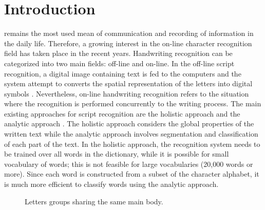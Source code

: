 \documentclass[journal,compsoc]{IEEEtran}
\begin{document}
\IEEEdisplaynotcompsoctitleabstractindextext

\section{Introduction}
\date
{} remains the most used mean of communication and recording of information in the daily life. Therefore, a growing interest in the on-line character recognition field has taken place in the recent years.
Handwriting recognition can be categorized into two main fields: off-line and on-line. In the off-line script recognition, a digital image containing text is fed to the computers and the system attempt to converts the spatial representation of the letters into digital symbols \cite{al2011online}. Nevertheless, on-line handwriting recognition refers to the situation where the recognition is performed concurrently to the writing process. The main existing approaches for script recognition are the holistic approach \cite{biadsy2011segmentation} and the analytic approach \cite{abdulla2008off, sari2002off, Dinges2011, elanwar2012unconstrained}. The holistic approach considers the global properties of the written text while the analytic approach involves segmentation and classification of each part of the text.  In the holistic approach, the recognition system needs to be trained over all words in the dictionary, while it is possible for small vocabulary of words; this is not feasible for large vocabularies (20,000 words or more). Since each word is constructed from a subset of the character alphabet, it is much more efficient to classify words using the analytic approach. \cite{elanwar2012unconstrained} \\

\begin{figure}
\centering
    \caption{Letters groups sharing the same main body.}
   \label{fig:same_main_body_letters}
\end{figure}
\end{document}

